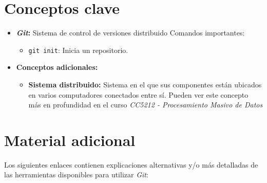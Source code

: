   \section{Conceptos clave}
    \begin{itemize}
      \item \textbf{\textit{Git}:} Sistema de control de versiones distribuido
        Comandos importantes:
        \begin{itemize}
          \item \texttt{git init}: Inicia un repositorio.
        \end{itemize}
      \item \textbf{Conceptos adicionales:}
        \begin{itemize}
          \item \textbf{Sistema distribuido:\label{kw:distr-sist}}
            Sistema en el que sus componentes están ubicados en varios computadores 
            conectados entre sí.
            Pueden ver este concepto más en profundidad en el curso \textit{CC5212 - 
            Procesamiento Masivo de Datos}
        \end{itemize} 
    \end{itemize}
  \section{Material adicional}
    Los siguientes enlaces contienen explicaciones alternativas y/o más detalladas de
    las herramientas disponibles para utilizar \textit{Git}:
    
